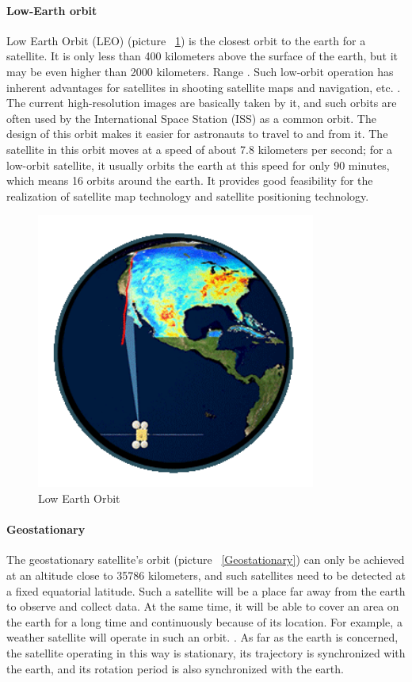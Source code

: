 \documentclass[conference]{IEEEtran}
\begin{document}
\paragraph{Low-Earth orbit}

Low Earth Orbit (LEO) (picture ~\ref{LEO}) is the closest orbit to the earth for a satellite. It is only less than 400 kilometers above the surface of the earth, but it may be even higher than 2000 kilometers. Range \cite{WhatisRe36:online}. Such low-orbit operation has inherent advantages for satellites in shooting satellite maps and navigation, etc. \cite{earthdata28:online}. The current high-resolution images are basically taken by it, and such orbits are often used by the International Space Station (ISS) as a common orbit. The design of this orbit makes it easier for astronauts to travel to and from it. The satellite in this orbit moves at a speed of about 7.8 kilometers per second; for a low-orbit satellite, it usually orbits the earth at this speed for only 90 minutes, which means 16 orbits around the earth. It provides good feasibility for the realization of satellite map technology and satellite positioning technology\cite{ESAkerne12: online}.

\begin{figure}[htbp]
    \centerline{\includegraphics[width=260pt]{images/1.1.2.png}}
    \caption{Low Earth Orbit}
    \label{LEO}
\end{figure}


\paragraph{Geostationary}
The geostationary satellite's orbit (picture ~\ref{Geostationary}) can only be achieved at an altitude close to 35786 kilometers, and such satellites need to be detected at a fixed equatorial latitude\cite{Synchron89:online}. Such a satellite will be a place far away from the earth to observe and collect data. At the same time, it will be able to cover an area on the earth for a long time and continuously because of its location. For example, a weather satellite will operate in such an orbit. \Cite{WhatisRe36:online}. As far as the earth is concerned, the satellite operating in this way is stationary, its trajectory is synchronized with the earth, and its rotation period is also synchronized with the earth\cite{CelesTra70:online}.
\end{document}
